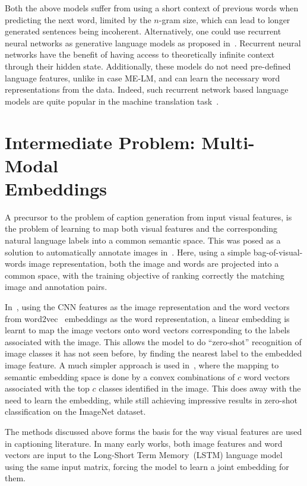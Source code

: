 Both the above models suffer from using a short context of previous words when
predicting the next word, limited by the $n$-gram size, which can lead to longer
generated sentences being incoherent.
Alternatively, one could use recurrent neural networks as generative language
models as proposed in~\cite{mikolov2010recurrent}.
Recurrent neural networks have the benefit of having access to theoretically
infinite context through their hidden state.
Additionally, these models do not need pre-defined language features, unlike in case
ME-LM, and can learn the necessary word representations from the data. 
Indeed, such recurrent network based language models are quite popular in
the machine translation task~\cite{bahdanau2014neural}.

\section{Intermediate Problem: Multi-Modal \\Embeddings}
A precursor to the problem of caption generation from input visual features, is
the problem of learning to map both visual features and the corresponding
natural language labels into a common semantic space.
This was posed as a solution to automatically annotate images
in~\cite{weston2010large}.
Here, using a simple bag-of-visual-words image representation, both the image
and words are projected into a common space, with the training objective of
ranking correctly the matching image and annotation pairs. 

In~\cite{frome2013devise}, using the CNN features as the image representation
and the word vectors from word2vec~\cite{mikolov2013distributed} embeddings as
the word representation, a linear embedding is learnt to map the image vectors
onto word vectors corresponding to the labels associated with the image.
This allows the model to do ``zero-shot'' recognition of image classes it has
not seen before, by finding the nearest label to the embedded image feature.
A much simpler approach is used in~\cite{norouzi2013zero}, where the mapping to
semantic embedding space is done by a convex combinations of $c$ word vectors
associated with the top $c$ classes identified in the image.
This does away with the need to learn the embedding, while still achieving
impressive results in zero-shot classification on the ImageNet dataset.

The methods discussed above forms the basis for the way visual features are used
in captioning literature.
In many early works, both image features and word vectors are input to the
Long-Short Term Memory~(LSTM) language model using the same input matrix,
forcing the model to learn a joint embedding for them.

